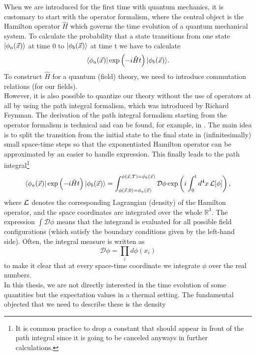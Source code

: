 When we are introduced for the first time with quantum mechanics, it is customary to start with the operator formalism, where the central object is the Hamilton operator $\hat H$ which governs the time evolution of a quantum mechanical system. To calculate the probability that a state transitions from one state $\lvert\phi_a(\vec x)\rangle$ at time 0 to $\lvert\phi_b(\vec x)\rangle$ at time t we have to calculate
\begin{equation}
    \langle\phi_a(\vec x)\rvert\exp\left(-i\hat H t\right)\lvert\phi_b(\vec x)\rangle.\label{eq:timeEvolv}
\end{equation}
To construct $\hat H$ for a quantum (field) theory, we need to introduce commutation relations (for our fields).\\
However, it is also possible to quantize our theory without the use of operators at all by using the path integral formalism, which was introduced by Richard Feynman.
The derivation of the path integral formalism starting from the operator formalism is technical and can be found, for example, in \cite{peskin}. The main idea is to split the transition from the initial state to the final state in (infinitesimally) small space-time steps so that the exponentiated Hamilton operator can be approximated by an easier to handle expression. This finally leads to the path integral\footnote{It is common practice to drop a constant that should appear in front of the path integral since it is going to be canceled anyways in further calculations.} 
\begin{equation}
     \langle\phi_a(\vec x)\rvert\exp\left(-i\hat H t\right)\lvert\phi_b(\vec x)\rangle=\int_{\phi(\vec x,0)=\phi_a(\vec x)}^{\phi(\vec x,T)=\phi_b(\vec x)} \mathcal D\phi \exp\left(i\int_0 ^td^4x\, \mathcal L[\phi]\right),\label{eq:pathIntTime}
\end{equation}
where $\mathcal L$ denotes the corresponding Lagrangian (density) of the Hamilton operator, and the space coordinates are integrated over the whole $\mathbb R ^3$. The expression $\int \mathcal D \phi$ means that the integrand is evaluated for all possible field configurations (which satisfy the boundary conditions given by the left-hand side). Often, the integral measure is written as 
\begin{equation}
    \mathcal{D} \phi =\prod_i d\phi(x_i)
\end{equation}
to make it clear that at every space-time coordinate we integrate $\phi$ over the real numbers. \\
In this thesis, we are not directly interested in the time evolution of some quantities but the expectation values in a thermal setting. The fundamental objected that we need to describe these is the density
